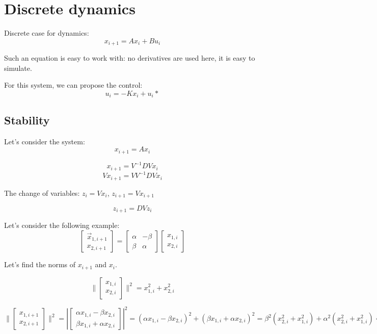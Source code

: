 \section{Discrete dynamics}

Discrete case for dynamics:
\[x_{i+1} = Ax_i +  Bu_i\]

Such an equation is easy to work with: no derivatives are used here, it is easy to simulate. 

For this system, we can propose the control: \[u_i = -Kx_i + u_i*\]
\subsection{Stability}

Let's consider the system:
\[x_{i+1} = A x_i\]

\[x_{i+1} = V^{-1}DV x_i\]
\[V x_{i+1} = V V^{-1}DV x_i\]

The change of variables:
$z_{i} = V x_{i}$, $z_{i+1} = V x_{i+1}$

\[z_{i+1} = DV z_i\]

Let's consider the following example:
\[
\begin{bmatrix}
\vec{x}_{1,i+1} \\
x_{2, i+1}
\end{bmatrix}
=
\begin{bmatrix}
\alpha & -\beta \\
\beta & \alpha
\end{bmatrix}
\begin{bmatrix}
x_{1, i} \\
x_{2, i}
\end{bmatrix}
\]

Let's find the norms of \(x_{i+1}\) and \(x_i\).

\[
\| \begin{bmatrix}
x_{1, i} \\
x_{2, i}
\end{bmatrix}
\|^2 = x_{1, i}^2 + x_{2, i}^2
\]

\[
\| \begin{bmatrix}
x_{1, i+1} \\
x_{2, i+1}
\end{bmatrix}
\|^2 = \left| \begin{bmatrix}
\alpha x_{1, i} - \beta x_{2, i} \\
\beta x_{1, i} + \alpha x_{2, i}
\end{bmatrix} \right|^2
= (\alpha x_{1, i} - \beta x_{2, i})^2 + (\beta x_{1, i} + \alpha x_{2, i})^2
= \beta^2 (x_{2,i}^2 + x_{1,i}^2) + \alpha^2 (x_{2,i}^2 + x_{1,i}^2)
= (\alpha^2 + \beta^2) (x_{1, i}^2 + x_{2, i}^2)
\]

